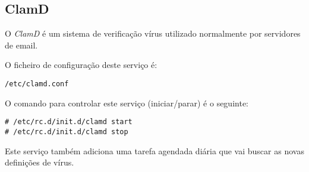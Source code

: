 \subsection{ClamD}

O \emph{ClamD} é um sistema de verificação vírus utilizado normalmente por servidores de email.

O ficheiro de configuração deste serviço é:

\begin{Verbatim}[commandchars=\\\{\}]
/etc/clamd.conf
\end{Verbatim}

O comando para controlar este serviço (iniciar/parar) é o seguinte:

\begin{Verbatim}[commandchars=\\\{\}]
# /etc/rc.d/init.d/clamd start
# /etc/rc.d/init.d/clamd stop
\end{Verbatim}

Este serviço também adiciona uma tarefa agendada diária que vai buscar as novas definições de vírus.
